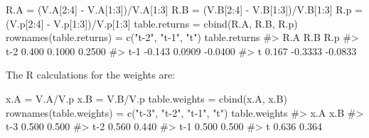 \documentclass[
  letterpaper,
  DIV=11,
  numbers=noendperiod]{scrreprt}
\newenvironment{Shaded}{\begin{snugshade}}{\end{snugshade}}
\newcommand{\CommentTok}[1]{\textcolor[rgb]{0.37,0.37,0.37}{#1}}
\newcommand{\DecValTok}[1]{\textcolor[rgb]{0.68,0.00,0.00}{#1}}
\newcommand{\FunctionTok}[1]{\textcolor[rgb]{0.28,0.35,0.67}{#1}}
\newcommand{\NormalTok}[1]{\textcolor[rgb]{0.00,0.23,0.31}{#1}}
\newcommand{\OtherTok}[1]{\textcolor[rgb]{0.00,0.23,0.31}{#1}}
\newcommand{\SpecialCharTok}[1]{\textcolor[rgb]{0.37,0.37,0.37}{#1}}
\newcommand{\StringTok}[1]{\textcolor[rgb]{0.13,0.47,0.30}{#1}}
\theoremstyle{definition}
\theoremstyle{definition}
\theoremstyle{remark}
\begin{document}
\begin{Shaded}
\begin{Highlighting}[]
\NormalTok{R.A }\OtherTok{=}\NormalTok{ (V.A[}\DecValTok{2}\SpecialCharTok{:}\DecValTok{4}\NormalTok{] }\SpecialCharTok{{-}}\NormalTok{ V.A[}\DecValTok{1}\SpecialCharTok{:}\DecValTok{3}\NormalTok{])}\SpecialCharTok{/}\NormalTok{V.A[}\DecValTok{1}\SpecialCharTok{:}\DecValTok{3}\NormalTok{]}
\NormalTok{R.B }\OtherTok{=}\NormalTok{ (V.B[}\DecValTok{2}\SpecialCharTok{:}\DecValTok{4}\NormalTok{] }\SpecialCharTok{{-}}\NormalTok{ V.B[}\DecValTok{1}\SpecialCharTok{:}\DecValTok{3}\NormalTok{])}\SpecialCharTok{/}\NormalTok{V.B[}\DecValTok{1}\SpecialCharTok{:}\DecValTok{3}\NormalTok{]}
\NormalTok{R.p }\OtherTok{=}\NormalTok{ (V.p[}\DecValTok{2}\SpecialCharTok{:}\DecValTok{4}\NormalTok{] }\SpecialCharTok{{-}}\NormalTok{ V.p[}\DecValTok{1}\SpecialCharTok{:}\DecValTok{3}\NormalTok{])}\SpecialCharTok{/}\NormalTok{V.p[}\DecValTok{1}\SpecialCharTok{:}\DecValTok{3}\NormalTok{]}
\NormalTok{table.returns }\OtherTok{=} \FunctionTok{cbind}\NormalTok{(R.A, R.B, R.p)}
\FunctionTok{rownames}\NormalTok{(table.returns) }\OtherTok{=}  \FunctionTok{c}\NormalTok{(}\StringTok{"t{-}2"}\NormalTok{, }\StringTok{"t{-}1"}\NormalTok{, }\StringTok{"t"}\NormalTok{)}
\NormalTok{table.returns}
\CommentTok{\#\textgreater{}        R.A     R.B     R.p}
\CommentTok{\#\textgreater{} t{-}2  0.400  0.1000  0.2500}
\CommentTok{\#\textgreater{} t{-}1 {-}0.143  0.0909 {-}0.0400}
\CommentTok{\#\textgreater{} t    0.167 {-}0.3333 {-}0.0833}
\end{Highlighting}
\end{Shaded}

The R calculations for the weights are:

\begin{Shaded}
\begin{Highlighting}[]
\NormalTok{x.A }\OtherTok{=}\NormalTok{ V.A}\SpecialCharTok{/}\NormalTok{V.p}
\NormalTok{x.B }\OtherTok{=}\NormalTok{ V.B}\SpecialCharTok{/}\NormalTok{V.p}
\NormalTok{table.weights }\OtherTok{=} \FunctionTok{cbind}\NormalTok{(x.A, x.B)}
\FunctionTok{rownames}\NormalTok{(table.weights) }\OtherTok{=} \FunctionTok{c}\NormalTok{(}\StringTok{"t{-}3"}\NormalTok{, }\StringTok{"t{-}2"}\NormalTok{, }\StringTok{"t{-}1"}\NormalTok{, }\StringTok{"t"}\NormalTok{)}
\NormalTok{table.weights}
\CommentTok{\#\textgreater{}       x.A   x.B}
\CommentTok{\#\textgreater{} t{-}3 0.500 0.500}
\CommentTok{\#\textgreater{} t{-}2 0.560 0.440}
\CommentTok{\#\textgreater{} t{-}1 0.500 0.500}
\CommentTok{\#\textgreater{} t   0.636 0.364}
\end{Highlighting}
\end{Shaded}
\end{document}
